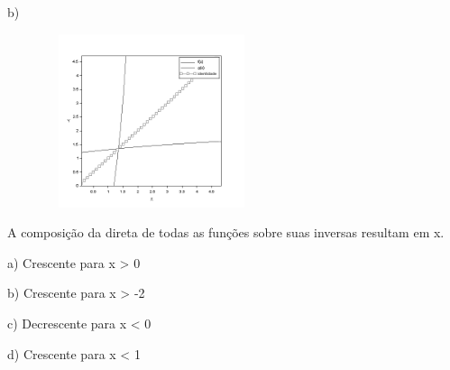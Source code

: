 \begin{respostas}{6}
\begin{multicols}{2}
    b)\begin{figure}[H]
        \begin{Center}
        \includegraphics[width=2.5in,height=2in]{capitulos/logaritmos_e_funcao_logaritmica/media/image18.png}
        \end{Center}
    \end{figure}

    \ansitem{} A composição da direta de todas as funções sobre suas inversas resultam em x.

    \ansitem{}
        a) Crescente para x > 0

        b) Crescente para x > -2

        c) Decrescente para x < 0

        d) Crescente para x < 1
\end{multicols}
\end{respostas}

